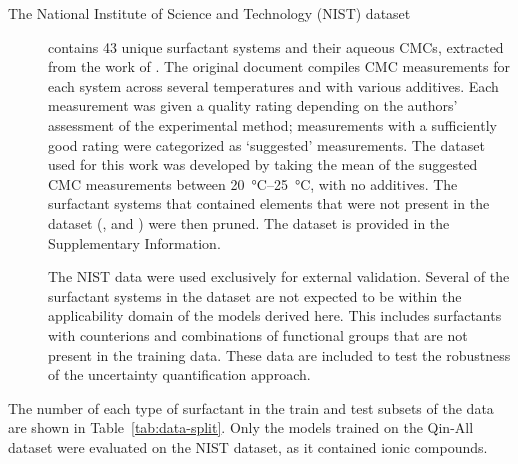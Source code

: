 \begin{description}
    \item[The National Institute of Science and Technology (NIST) dataset]
          contains 43 unique surfactant systems and their aqueous CMCs,
          extracted from the work of
          \citet{mukerjeeCriticalMicelleConcentrations1971}. The original
          document compiles CMC measurements for each system across several
          temperatures and with various additives. Each measurement was given a
          quality rating depending on the authors' assessment of the
          experimental method; measurements with a sufficiently good rating were
          categorized as `suggested' measurements. The dataset used for this
          work was developed by taking the mean of the suggested CMC
          measurements between \SIrange{20}{25}{\degreeCelsius}, with no
          additives. The surfactant systems that contained elements that were
          not present in the dataset (,  and ) were then
          pruned. The dataset is provided in the Supplementary Information.

          The NIST data were used exclusively for external validation. Several
          of the surfactant systems in the dataset are not expected to be within
          the applicability domain of the models derived here. This includes
          surfactants with counterions and combinations of functional groups
          that are not present in the training data. These data are included to
          test the robustness of the uncertainty quantification approach.
\end{description}

The number of each type of surfactant in the train and test subsets of the data are shown in Table~\ref{tab:data-split}. Only the models trained on the Qin-All dataset were evaluated on the NIST dataset, as it contained ionic compounds.

